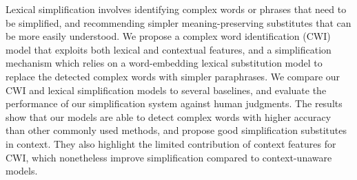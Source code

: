 Lexical simplification involves identifying complex words or phrases that need to be simplified, and recommending simpler meaning-preserving substitutes that can be more easily understood. We propose a complex word identification (CWI) model that exploits both lexical and contextual features, and a simplification mechanism which relies on a word-embedding lexical substitution model to replace the detected complex words with simpler paraphrases. We compare our CWI and lexical simplification models to several baselines, and evaluate the performance of our simplification system against human judgments. The results show that our models are able to detect complex words with higher accuracy than other commonly used methods, and propose good simplification substitutes in context. They also highlight the limited contribution of context features for CWI, which nonetheless improve simplification compared to context-unaware models.

